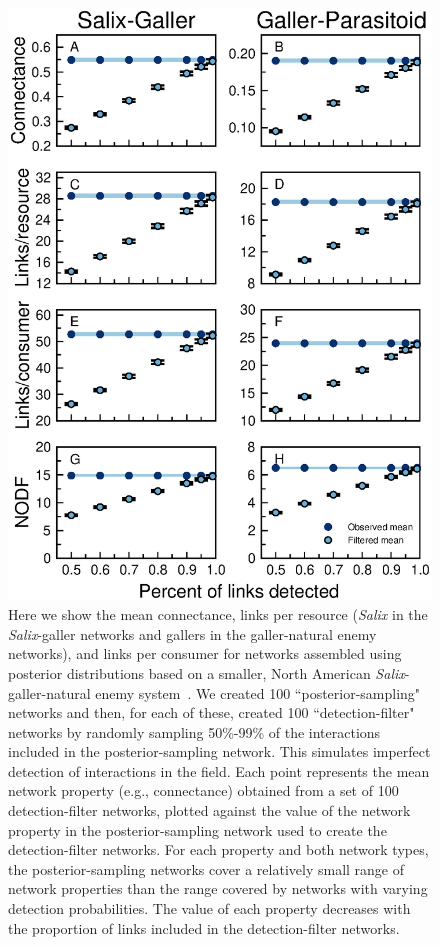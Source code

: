 \documentclass[12pt]{article}
\begin{document}
    \begin{figure}[ht]
    \caption{Here we show the mean connectance, links per resource (\emph{Salix} in the \emph{Salix}-galler networks and gallers in the galler-natural enemy networks), and links per consumer for networks assembled using posterior distributions based on a smaller, North American \emph{Salix}-galler-natural enemy system~\citep{Barbour2016,Barbour2016Dryad}. We created 100 ``posterior-sampling" networks and then, for each of these, created 100 ``detection-filter" networks by randomly sampling 50\%-99\% of the interactions included in the posterior-sampling network. This simulates imperfect detection of interactions in the field. Each point represents the mean network property (e.g., connectance) obtained from a set of 100 detection-filter networks, plotted against the value of the network property in the posterior-sampling network used to create the detection-filter networks. For each property and both network types, the posterior-sampling networks cover a relatively small range of network properties than the range covered by networks with varying detection probabilities. The value of each property decreases with the proportion of links included in the detection-filter networks.}
    \label{posterior_webs}    
    \includegraphics[width=.8\textwidth]{Figures/Salix_Galler_posterior_properties.eps}
    \end{figure}
\end{document}
